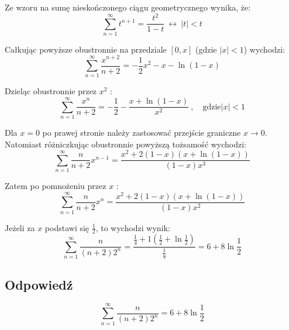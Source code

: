 \documentclass{article}
\newcommand{\for}{\ \leftrightarrow\ }
\DeclareMathOperator{\?}{?}
\begin{document}
Ze wzoru na sumę nieskończonego ciągu geometrycznego wynika, że:
\begin{equation*}
   \sum_{n=1}^{\infty} t^{n+1} = \frac{t^2}{1-t} \for |t| < t
\end{equation*}

Całkując powyższe obustronnie na przedziale $[0,x]$ (gdzie $|x|<1$) wychodzi:
\begin{equation*}
   \sum_{n=1}^{\infty} \frac{x^{n+2}}{n+2} = -\frac{1}{2}x^2 - x - \ln(1-x)
\end{equation*}

Dzieląc obustronnie przez $x^2$ :
\begin{equation*}
   \sum_{n=1}^{\infty} \frac{x^n}{n+2} = -\frac{1}{2} - \frac{x + \ln(1-x)}{x^2} \mathrm{\ , \quad gdzie } |x| < 1
\end{equation*}

Dla $x=0$ po prawej stronie należy zastosować przejście graniczne $x \to 0$.
Natomiast różniczkując obustronnie powyższą tożsamość wychodzi:
\begin{equation*}
   \sum_{n=1}^{\infty} \frac{n}{n+2}x^{n-1} = \frac{x^2 + 2(1-x)(x + \ln(1-x))}{(1-x)x^3}
\end{equation*}

Zatem po pomnożeniu przez $x$ :
\begin{equation*}
   \sum_{n=1}^{\infty} \frac{n}{n+2}x^n = \frac{x^2 + 2(1-x)(x + \ln(1-x))}{(1-x)x^2}
\end{equation*}

Jeżeli za $x$ podstawi się $\frac{1}{2}$, to wychodzi wynik:
\begin{equation*}
   \sum_{n=1}^{\infty} \frac{n}{(n+2)2^n} = \frac{\frac{1}{4} + 1(\frac{1}{2} + \ln{\frac{1}{2}})}{\frac{1}{8}}
   = 6 + 8\ln{\frac{1}{2}}
\end{equation*}

\subsection*{Odpowiedź}
\[ \sum_{n=1}^{\infty} \frac{n}{(n+2)2^n} = 6 + 8\ln{\frac{1}{2}} \]
\end{document}
